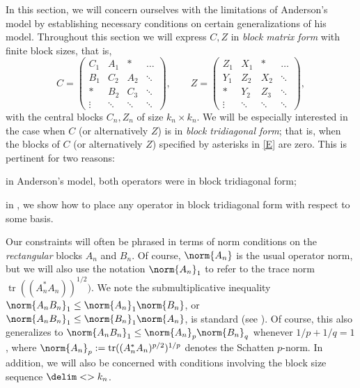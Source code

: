 \documentclass[10pt,reqno]{amsart}
\theoremstyle{remark}
\DeclareMathOperator{\trace}{tr}
\newcommand{\seq}{\delim<>}
\newcommand{\term}[1]{\emph{#1}}
\numberwithin{equation}{section}
\begin{document}
In this section, we will concern ourselves with the limitations of Anderson's model by establishing necessary conditions on certain generalizations of his model.
Throughout this section we will express $C,Z$ in \term{block matrix form} with finite block sizes, that is,
\begin{equation}
  \label{E}
  C =
  \begin{pmatrix}
    C_1 &  A_1  &*  &\dots          \\
    B_1 & C_2&A_2   &\ddots           \\
    * &B_2 &C_3 &\ddots            \\
    \vdots &\ddots &\ddots  &\ddots
  \end{pmatrix},
  \qquad
  Z =
  \begin{pmatrix}
    Z_1 &  X_1  &*  &\dots          \\
    Y_1 & Z_2&X_2   &\ddots           \\
    * &Y_2 &Z_3 &\ddots            \\
    \vdots &\ddots &\ddots  &\ddots
  \end{pmatrix},
\end{equation}
with the central blocks $C_n, Z_n$ of size $k_n\times k_n$.
We will be especially interested in the case when $C$ (or alternatively $Z$) is in \term{block tridiagonal form};
that is, when the blocks of $C$ (or alternatively $Z$) specified by asterisks in \eqref{E} are zero.
This is pertinent for two reasons:
\begin{enumerate*} 
\item in Anderson's model, both operators were in block tridiagonal form;
\item in , we show how to place any operator in block tridiagonal form with respect to some basis.
\end{enumerate*}

Our constraints will often be phrased in terms of norm conditions on the \emph{rectangular} blocks $A_n$ and $B_n$.
Of course, $\norm{A_n}$ is the usual operator norm, but we will also use the notation $\norm{A_n}_1$ to refer to the trace norm $\trace((A_n^{*} A_n))^{1/2})$.
We note the submultiplicative inequality $\norm{A_n B_n}_1 \le \norm{A_n}_1 \norm{B_n}$, or $\norm{A_n B_n}_1 \le \norm{B_n}_1 \norm{A_n}$, is standard (see \cite[p.~454, 7.3.P16]{HJ-2013-MA}).
Of course, this also generalizes to $\norm{A_n B_n}_1 \le \norm{A_n}_p \norm{B_n}_q$ whenever $1/p + 1/q = 1$, where $\norm{A_n}_p := \trace((A_n^{*}A_n)^{p/2})^{1/p}$ denotes the Schatten $p$-norm.
In addition, we will also be concerned with conditions involving the block size sequence $\seq{k_n}$.
\end{document}
